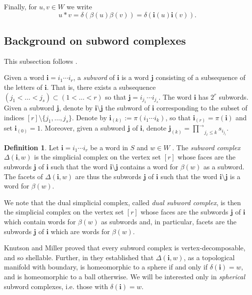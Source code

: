 \documentclass[a4paper, 11pt]{amsart}
\newcommand{\word}[1]{\mathbf{#1}}
\theoremstyle{definition}
\newtheorem{definition}[theorem]{Definition}
\begin{document}
Finally, for $u,v\in W$ we write 
\[
u*v=\delta(\beta(u)\beta(v)) = \delta(\word{i}(u)\word{i}(v)).
\]


\subsection{Background on subword complexes}
\label{sect:background_subword}
This subsection follows \cite{escobar, cls, PilaudStump-EL,pilaud_stump_15}.

Given a word $\word{i}=i_1\cdots i_r$, a \emph{subword} of $\word{i}$ is a word $\word{j}$ consisting of a subsequence of the letters of $\word{i}$. 
That is, there exists a subsequence $(j_1<\dots<j_s)\subset (1<\dots<r)$ so that $\word{j}=i_{j_1}\cdots i_{j_s}$.
The word $\word{i}$ has $2^r$ subwords. 
Given a subword $\word{j}$, denote by $\word{i}\setminus \word{j}$ the subword of $\word{i}$ corresponding to the subset of indices $[r]\setminus \{j_1,\dots,j_s\}$.
Denote by $\word{i}_{(k)}:=\pi(i_{1}\cdots i_k)$, so that $\word{i}_{(r)}=\pi(\word{i})$ and set $\word{i}_{(0)}=1$. Moreover, given a subword $\word{j}$ of $\word{i}$, denote $\word{j}_{(k)} = \overrightarrow{\prod}_{j_{\ell} \leq k}s_{i_{j_{\ell}}}$.

\begin{definition}
Let $\word{i}=i_1\cdots i_r$ be a word in $S$ and $w \in W$ . The \emph{subword complex} $\Delta(\word{i},w)$ is the simplicial complex on the vertex set $[r]$ whose faces are the subwords $\word{j}$ of $\word{i}$ such that the 
word $\word{i}\setminus\word{j}$ contains a word for $\beta(w)$ as a subword. The facets of  $\Delta(\word{i},w)$ are thus the subwords $\word{j}$ of $\word{i}$ such that the word $\word{i}\setminus\word{j}$ is a word for $\beta(w)$.
\end{definition}

We note that the dual simplicial complex, called  \emph{dual subword complex}, is then the simplicial complex on the vertex set $[r]$ whose faces are the subwords $\word{j}$ of $\word{i}$ which contain  words for $\beta(w)$ as subwords and, in particular, facets are the subwords $\word{j}$ of $\word{i}$ which are words for $\beta(w)$. 

Knutson and Miller \cite{knutson_miller_04} proved that every subword complex is vertex-decomposable, and so shellable. Further, in \cite[Corollary 3.8]{knutson_miller_04} they established that $\Delta(\word{i},w)$, as a topological manifold with boundary, is homeomorphic to a sphere if and only if $\delta(\word{i}) = w$, and is homeomorphic to a ball otherwise. We will be interested only in \emph{spherical} subword complexes, i.e. those with $\delta(\word{i}) = w$.
\end{document}
